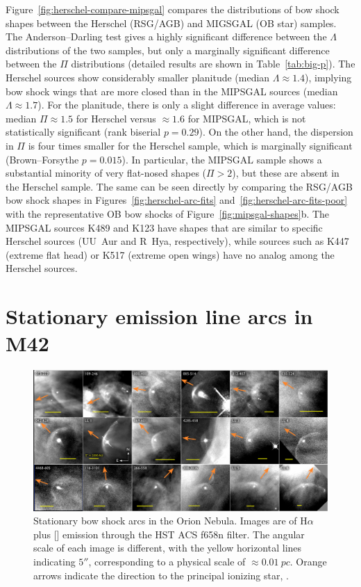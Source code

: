 Figure~\ref{fig:herschel-compare-mipsgal} compares the distributions
of bow shock shapes between the Herschel (RSG/AGB) and MIGSGAL (OB
star) samples.  The Anderson--Darling test gives a highly significant
difference between the \(\Lambda\) distributions of the two samples, but
only a marginally significant difference between the \(\Pi\)
distributions (detailed results are shown in Table~\ref{tab:big-p}).
The Herschel sources show considerably smaller planitude (median
\(\Lambda \approx 1.4\)), implying bow shock wings that are more closed than in
the MIPSGAL sources (median \(\Lambda \approx 1.7\)).  For the planitude, there is
only a slight difference in average values: median \(\Pi \approx 1.5\) for
Herschel versus \(\approx 1.6\) for MIPSGAL, which is not statistically
significant (rank biserial \(p = 0.29\)).  On the other hand, the
dispersion in \(\Pi\) is four times smaller for the Herschel sample,
which is marginally significant (Brown--Forsythe \(p = 0.015\)).  In
particular, the MIPSGAL sample shows a substantial minority of very
flat-nosed shapes (\(\Pi > 2\)), but these are absent in the Herschel
sample.  The same can be seen directly by comparing the RSG/AGB bow
shock shapes in Figures~\ref{fig:herschel-arc-fits}
and~\ref{fig:herschel-arc-fits-poor} with the representative OB bow
shocks of Figure~\ref{fig:mipsgal-shapes}b.  The MIPSGAL sources K489
and K123 have shapes that are similar to specific Herschel sources
(UU~Aur and R~Hya, respectively), while sources such as K447 (extreme
flat head) or K517 (extreme open wings) have no analog among the
Herschel sources.

\section{Stationary emission line arcs in M42}
\label{sec:stat-emiss-line}

\begin{figure}
  \centering
  \includegraphics[width=\linewidth]{figs/annotated-ll-arcs}
  \caption[]{Stationary bow shock arcs in the Orion Nebula.  Images
    are of H\(\alpha\) plus [] emission through the HST ACS f658n
    filter. The angular scale of each image is different, with the
    yellow horizontal lines indicating \(5''\), corresponding to a
    physical scale of \(\approx\SI{0.01}{pc}\).  Orange arrows indicate the
    direction to the principal ionizing star, \thC. }
  \label{fig:ll-arcs}
\end{figure}

